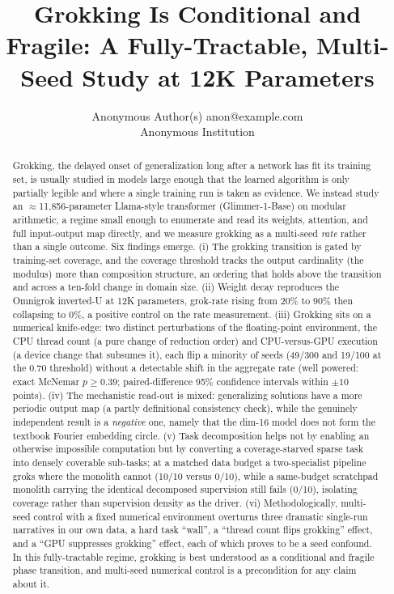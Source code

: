 \documentclass[10pt]{article} %
\title{Grokking Is Conditional and Fragile: A Fully-Tractable, Multi-Seed Study at 12K Parameters}
\author{\name Anonymous Author(s) \email anon@example.com \\
      \addr Anonymous Institution}
\begin{document}
\maketitle

\begin{abstract}
Grokking, the delayed onset of generalization long after a network has fit its training set, is
usually studied in models large enough that the learned algorithm is only partially legible and
where a single training run is taken as evidence. We instead study an $\approx$11{,}856-parameter
Llama-style transformer (Glimmer-1-Base) on modular arithmetic, a regime small enough to enumerate
and read its weights, attention, and full input-output map directly, and we measure grokking as a
multi-seed \emph{rate} rather than a single outcome. Six findings emerge. (i) The grokking
transition is gated by training-set coverage, and the coverage threshold tracks
the output cardinality (the modulus) more than composition structure, an ordering that holds above
the transition and across a ten-fold change in domain size. (ii) Weight decay reproduces the Omnigrok
inverted-U at 12K parameters, grok-rate rising from 20\% to 90\% then collapsing to 0\%, a positive
control on the rate measurement. (iii) Grokking sits on a
numerical knife-edge: two distinct perturbations of the floating-point environment, the CPU thread
count (a pure change of reduction order) and CPU-versus-GPU execution (a device change that subsumes
it), each flip a minority of seeds (49/300 and 19/100 at the 0.70 threshold) without a detectable
shift in the aggregate rate (well powered: exact McNemar $p\ge0.39$; paired-difference 95\%
confidence intervals within $\pm10$ points). (iv) The mechanistic read-out is mixed:
generalizing solutions have a more periodic output map (a partly definitional consistency check),
while the genuinely independent result is a \emph{negative} one, namely that the dim-16 model does
not form the textbook Fourier embedding circle. (v) Task decomposition helps not by enabling an
otherwise impossible computation but by converting a coverage-starved sparse task into densely
coverable sub-tasks; at a matched data budget a two-specialist pipeline groks where the monolith
cannot (10/10 versus 0/10), while a same-budget scratchpad monolith carrying the identical
decomposed supervision still fails (0/10), isolating coverage rather than supervision density as the
driver. (vi) Methodologically, multi-seed
control with a fixed numerical environment overturns three dramatic single-run narratives in our
own data, a hard task ``wall'', a ``thread count flips grokking'' effect, and a ``GPU suppresses
grokking'' effect, each of which proves to be a seed confound. In this fully-tractable regime,
grokking is best understood as a conditional and fragile phase transition, and multi-seed numerical
control is a precondition for any claim about it.
\end{abstract}
\end{document}
